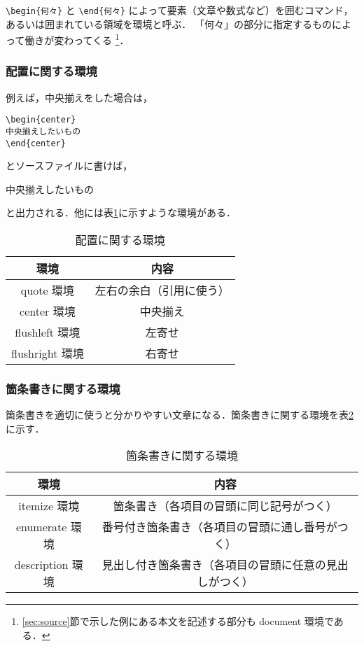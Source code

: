 \verb|\begin{何々}| と \verb|\end{何々}| によって要素（文章や数式など）を囲むコマンド，
あるいは囲まれている領域を環境と呼ぶ．
「何々」の部分に指定するものによって働きが変わってくる
\footnote{\ref{sec:source}節で示した例にある本文を記述する部分も document 環境である．}．

\subsubsection{配置に関する環境}
\label{sec:alignment}

例えば，中央揃えをした場合は，
\begin{screen}
\begin{verbatim}
\begin{center}
中央揃えしたいもの
\end{center}
\end{verbatim}
\end{screen}
とソースファイルに書けば，
\begin{screen}
\begin{center}
中央揃えしたいもの
\end{center}
\end{screen}
と出力される．他には表\ref{alignment}に示すような環境がある．

   \begin{table}[h]
       \caption{配置に関する環境}
       \label{alignment}
       \centering
       \begin{tabular}{c|c}
           環境 & 内容　\\ \hline
           quote 環境 & 左右の余白（引用に使う） \\
           center 環境 & 中央揃え \\
           flushleft 環境 & 左寄せ \\
           flushright 環境 & 右寄せ
       \end{tabular}
   \end{table}

\subsubsection{箇条書きに関する環境}

箇条書きを適切に使うと分かりやすい文章になる．箇条書きに関する環境を表\ref{itemize}に示す．

\begin{table}[h]
    \caption{箇条書きに関する環境}
    \label{itemize}
    \centering
    \begin{tabular}{c|c}
        環境 & 内容　\\ \hline
        itemize 環境 & 箇条書き（各項目の冒頭に同じ記号がつく） \\
        enumerate 環境 & 番号付き箇条書き（各項目の冒頭に通し番号がつく） \\
        description 環境 & 見出し付き箇条書き（各項目の冒頭に任意の見出しがつく）
    \end{tabular}
\end{table}



